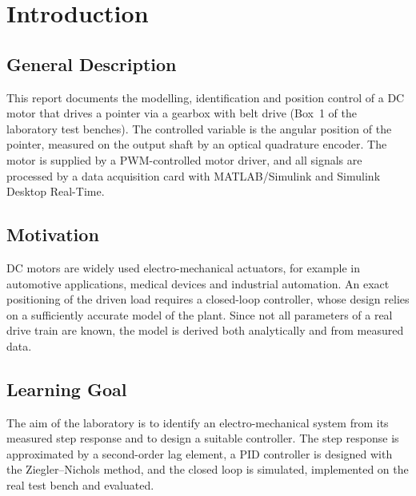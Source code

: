 \chapter{Introduction}\label{ch:introduction}

\section{General Description}\label{sec:general}
This report documents the modelling, identification and position control of a
DC motor that drives a pointer via a gearbox with belt drive (Box~1 of the
laboratory test benches). The controlled variable is the angular position of the
pointer, measured on the output shaft by an optical quadrature encoder. The motor
is supplied by a PWM-controlled motor driver, and all signals are processed by a
data acquisition card with MATLAB/Simulink and Simulink Desktop
Real-Time\autocite{laboranleitung}.

\section{Motivation}\label{sec:motivation}
DC motors are widely used electro-mechanical actuators, for example in
automotive applications, medical devices and industrial
automation\autocite{laboranleitung}. An exact positioning of the driven load
requires a closed-loop controller, whose design relies on a sufficiently
accurate model of the plant. Since not all parameters of a real drive train are
known, the model is derived both analytically and from measured data.

\section{Learning Goal}\label{sec:goal}
The aim of the laboratory is to identify an electro-mechanical system from its
measured step response and to design a suitable controller\autocite{laboranleitung}.
The step response is approximated by a second-order lag element, a PID
controller is designed with the Ziegler--Nichols method, and the closed loop is
simulated, implemented on the real test bench and evaluated.
